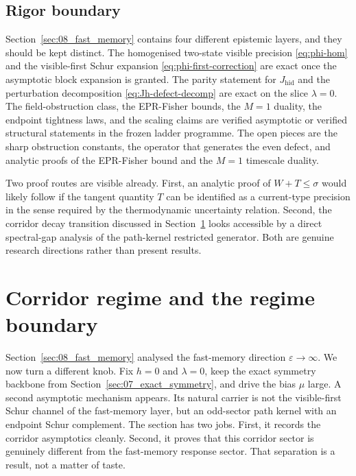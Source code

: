 \documentclass[11pt]{article}
\numberwithin{equation}{section}
\newcommand{\eps}{\varepsilon}
\theoremstyle{thmcompact}
\theoremstyle{remark}
\begin{document}
\subsection{Rigor boundary}

Section~\ref{sec:08_fast_memory} contains four different epistemic layers, and they should be kept distinct. The homogenised two-state visible precision \eqref{eq:phi-hom} and the visible-first Schur expansion \eqref{eq:phi-first-correction} are exact once the asymptotic block expansion is granted. The parity statement for $J_{\mathrm{hid}}$ and the perturbation decomposition \eqref{eq:Jh-defect-decomp} are exact on the slice $\lambda=0$. The field-obstruction class, the EPR-Fisher bounds, the $M=1$ duality, the endpoint tightness laws, and the scaling claims are verified asymptotic or verified structural statements in the frozen ladder programme. The open pieces are the sharp obstruction constants, the operator that generates the even defect, and analytic proofs of the EPR-Fisher bound and the $M=1$ timescale duality.

Two proof routes are visible already. First, an analytic proof of $W+T\le \sigma$ would likely follow if the tangent quantity $T$ can be identified as a current-type precision in the sense required by the thermodynamic uncertainty relation. Second, the corridor decay transition discussed in Section~\ref{sec:09_corridor_regime} looks accessible by a direct spectral-gap analysis of the path-kernel restricted generator. Both are genuine research directions rather than present results.

\section{Corridor regime and the regime boundary}
\label{sec:09_corridor_regime}

Section~\ref{sec:08_fast_memory} analysed the fast-memory direction $\eps\to\infty$. We now turn a different knob. Fix $h=0$ and $\lambda=0$, keep the exact symmetry backbone from Section~\ref{sec:07_exact_symmetry}, and drive the bias $\mu$ large. A second asymptotic mechanism appears. Its natural carrier is not the visible-first Schur channel of the fast-memory layer, but an odd-sector path kernel with an endpoint Schur complement. The section has two jobs. First, it records the corridor asymptotics cleanly. Second, it proves that this corridor sector is genuinely different from the fast-memory response sector. That separation is a result, not a matter of taste. \par
\end{document}
